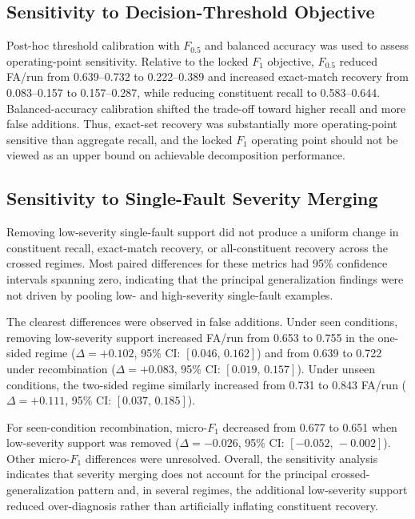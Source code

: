 \documentclass{ieeeaccess}
\begin{document}
\subsection{Sensitivity to Decision-Threshold Objective}
\label{subsec:threshold_sensitivity}

Post-hoc threshold calibration with $F_{0.5}$ and balanced accuracy was used
to assess operating-point sensitivity. Relative to the locked $F_1$
objective, $F_{0.5}$ reduced FA/run from 0.639--0.732 to 0.222--0.389 and
increased exact-match recovery from 0.083--0.157 to 0.157--0.287, while
reducing constituent recall to 0.583--0.644. Balanced-accuracy calibration
shifted the trade-off toward higher recall and more false additions. Thus,
exact-set recovery was substantially more operating-point sensitive than
aggregate recall, and the locked $F_1$ operating point should not be viewed
as an upper bound on achievable decomposition performance.

\subsection{Sensitivity to Single-Fault Severity Merging}
\label{subsec:severity_results}

Removing low-severity single-fault support did not produce a uniform change
in constituent recall, exact-match recovery, or all-constituent recovery
across the crossed regimes. Most paired differences for these metrics had
95\% confidence intervals spanning zero, indicating that the principal
generalization findings were not driven by pooling low- and high-severity
single-fault examples.

The clearest differences were observed in false additions. Under seen
conditions, removing low-severity support increased FA/run from 0.653 to
0.755 in the one-sided regime
($\Delta=+0.102$, 95\% CI: $[0.046,\,0.162]$) and from 0.639 to 0.722 under
recombination
($\Delta=+0.083$, 95\% CI: $[0.019,\,0.157]$).
Under unseen conditions, the two-sided regime similarly increased from
0.731 to 0.843 FA/run
($\Delta=+0.111$, 95\% CI: $[0.037,\,0.185]$).

For seen-condition recombination, micro-$F_1$ decreased from 0.677 to 0.651
when low-severity support was removed
($\Delta=-0.026$, 95\% CI: $[-0.052,\,-0.002]$). Other micro-$F_1$
differences were unresolved. Overall, the sensitivity analysis indicates that
severity merging does not account for the principal crossed-generalization
pattern and, in several regimes, the additional low-severity support reduced
over-diagnosis rather than artificially inflating constituent recovery.
\end{document}
